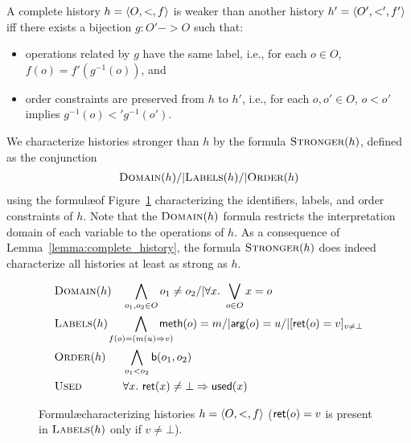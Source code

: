 \begin{lemma}
  \label{lemma:complete_history}

  A complete history $h={\langle{O,<,f}\rangle}$ is weaker than another history
  $h'={\langle{O',<',f'}\rangle}$ iff there exists a bijection $g:O'->O$ such that:

  \begin{itemize}

    \item operations related by $g$ have the same label, i.e., for each $o\in O$, $f(o)=f'(g^{-1}(o))$, and

    \item order constraints are preserved from $h$ to $h'$, i.e., for each $o,o'\in O$, $o< o'$ implies $g^{-1}(o)<' g^{-1}(o')$.


  \end{itemize}

\end{lemma}

We characterize histories stronger than $h$ by the formula $\textsc{Stronger}(h)$, defined as
the conjunction
\begin{align*}
  \textsc{Domain}(h) /| \textsc{Labels}(h) /| \textsc{Order}(h)
\end{align*}
using the formul\ae of Figure~\ref{fig:formula:history} characterizing the
identifiers, labels, and order constraints of $h$. Note that
the $\textsc{Domain}(h)$ formula restricts the interpretation domain of each
variable to the operations of $h$. As a consequence of
Lemma~\ref{lemma:complete_history}, the formula $\textsc{Stronger}(h)$ does
indeed characterize all histories at least as strong as $h$.

\begin{figure}
  \footnotesize
  \begin{align*}
    & \textsc{Domain}(h)
    && \bigwedge_{o_1, o_2 \in O} o_1 \neq o_2 /| \forall x.\ \bigvee_{o\in O} x = o \\
    & \textsc{Labels}(h)
    && \hspace{-5mm} \bigwedge_{f(o) = (m(u) => v)}
      \hspace{-5mm}
      {\sf meth}(o) = m /| {\sf arg}(o) = u /| 
      [{\sf ret}(o) = v]_{v \neq \bot} \\
    & \textsc{Order}(h)
    && \bigwedge_{o_1 < o_2} {\sf b}(o_1, o_2) \\
    & \textsc{Used} 
    && \forall x.\ {\sf ret}(x) \neq \bot => {\sf used}(x)
  \end{align*}
  \caption{Formul\ae characterizing histories $h = {\langle{O,<,f}\rangle}$ (${\sf ret}(o) = v$
  is present in $\textsc{Labels}(h)$ only if $v\neq \bot$).}
  \label{fig:formula:history}
\end{figure}

